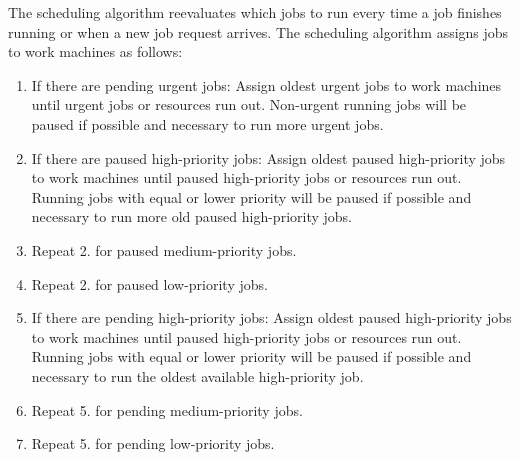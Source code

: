 The scheduling algorithm reevaluates which jobs to run every time a job finishes running or when a new job request arrives.
The scheduling algorithm assigns jobs to work machines as follows:
\begin{enumerate}
\item If there are pending urgent jobs:
Assign oldest urgent jobs to work machines until urgent jobs or resources run out.
Non-urgent running jobs will be paused if possible and necessary to run more urgent jobs.
\item If there are paused high-priority jobs:
Assign oldest paused high-priority jobs to work machines until paused high-priority jobs or resources run out.
Running jobs with equal or lower priority will be paused if possible and necessary to run more old paused high-priority jobs.
\item Repeat 2. for paused medium-priority jobs.
\item Repeat 2. for paused low-priority jobs.
\item If there are pending high-priority jobs:
Assign oldest paused high-priority jobs to work machines until paused high-priority jobs or resources run out.
Running jobs with equal or lower priority will be paused if possible and necessary to run the oldest available high-priority job.
\item Repeat 5. for pending medium-priority jobs.
\item Repeat 5. for pending low-priority jobs.
\end{enumerate}